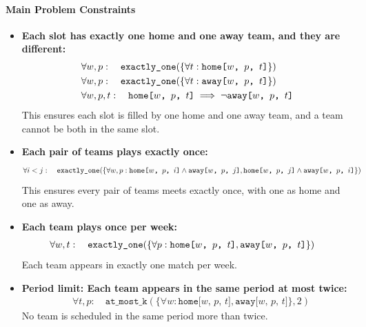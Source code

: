 \documentclass[11pt]{article}
\begin{document}
\paragraph{Main Problem Constraints}
\begin{itemize}
    \item \textbf{Each slot has exactly one home and one away team, and they are different:}
    \begin{align}
        &\forall w, p: \quad \texttt{exactly\_one}(\{\forall t: \space \texttt{home[$w$, $p$, $t$]}\}) \\
        &\forall w, p: \quad \texttt{exactly\_one}(\{\forall t: \space \texttt{away[$w$, $p$, $t$]}\}) \\
        &\forall w, p, t: \quad \texttt{home[$w$, $p$, $t$]} \implies \neg \texttt{away[$w$, $p$, $t$]}
    \end{align}
    This ensures each slot is filled by one home and one away team, and a team cannot be both in the same slot.

    \item \textbf{Each pair of teams plays exactly once:}
    \begin{align}
        &\forall i < j: \quad \texttt{exactly\_one}(\{ \forall w, p: \space \texttt{home[$w$, $p$, $i$]} \land \texttt{away[$w$, $p$, $j$]}, \texttt{home[$w$, $p$, $j$]} \land \texttt{away[$w$, $p$, $i$]}\})
    \end{align}
    This ensures every pair of teams meets exactly once, with one as home and one as away.

    \item \textbf{Each team plays once per week:}
    \begin{align}
        &\forall w, t: \quad \texttt{exactly\_one}(\{\forall p: \space \texttt{home[$w$, $p$, $t$]}, \texttt{away[$w$, $p$, $t$]}\})
    \end{align}
    Each team appears in exactly one match per week.

    \item \textbf{Period limit: Each team appears in the same period at most twice:}
    \begin{align}
        &\forall t, p: \quad \texttt{at\_most\_k}(\{\forall w: \texttt{home[$w$, $p$, $t$]}, \texttt{away[$w$, $p$, $t$]}\}, 2)
    \end{align}
    No team is scheduled in the same period more than twice.
\end{itemize}
\end{document}
